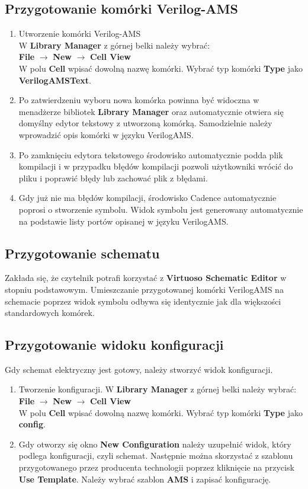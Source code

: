 \documentclass[10pt,a4paper,twoside]{report}
\theoremstyle{definition}
\theoremstyle{definition}
\theoremstyle{definition}
\theoremstyle{definition}
\theoremstyle{definition}
\begin{document}
{{{{{{{	\subsection{Przygotowanie komórki Verilog-AMS}
	\begin{enumerate}
		\item Utworzenie komórki Verilog-AMS \\
			W \textbf{Library Manager} z górnej belki należy wybrać: \\ 
			\textbf{File} $\rightarrow$ \textbf{New} $\rightarrow$ \textbf{Cell View} \\
			\subitem W polu \textbf{Cell} wpisać dowolną nazwę komórki.
			\subitem Wybrać typ komórki \textbf{Type} jako \textbf{VerilogAMSText}.
		\item Po zatwierdzeniu wyboru nowa komórka powinna być widoczna w menadżerze bibliotek \textbf{Library Manager} oraz automatycznie otwiera się domyślny edytor tekstowy z utworzoną komórką. Samodzielnie należy wprowadzić opis komórki w języku VerilogAMS.
		\item Po zamknięciu edytora tekstowego środowisko automatycznie podda plik kompilacji i w przypadku błędów kompilacji pozwoli użytkowniki wrócić do pliku i poprawić błędy lub zachować plik z błędami.
		\item Gdy już nie ma błędów kompilacji, środowisko Cadence automatycznie poprosi o stworzenie symbolu. Widok symbolu jest generowany automatycznie na podstawie listy portów opisanej w języku VerilogAMS.
	\end{enumerate}
	\subsection{Przygotowanie schematu}
	{	Zakłada się, że czytelnik potrafi korzystać z \textbf{Virtuoso Schematic Editor} w stopniu podstawowym. Umieszczanie przygotowanej komórki VerilogAMS na schemacie poprzez widok symbolu odbywa się identycznie jak dla większości standardowych komórek.}
	\subsection{Przygotowanie widoku konfiguracji}
	{	Gdy schemat elektryczny jest gotowy, należy stworzyć widok konfiguracji.}
	\begin{enumerate}
		\item Tworzenie konfiguracji.
			W \textbf{Library Manager} z górnej belki należy wybrać: \\ 
		\textbf{File} $\rightarrow$ \textbf{New} $\rightarrow$ \textbf{Cell View} \\
		\subitem W polu \textbf{Cell} wpisać dowolną nazwę komórki.
		\subitem Wybrać typ komórki \textbf{Type} jako \textbf{config}.
		\item Gdy otworzy się okno \textbf{New Configuration} należy uzupełnić widok, który podlega konfiguracji, czyli schemat. Następnie można skorzystać z szablonu przygotowanego przez producenta technologii poprzez kliknięcie na przycisk \textbf{Use Template}. Należy wybrać szablon \textbf{AMS} i zapisać konfigurację.
	\end{enumerate}

}}}}}}}
\end{document}
